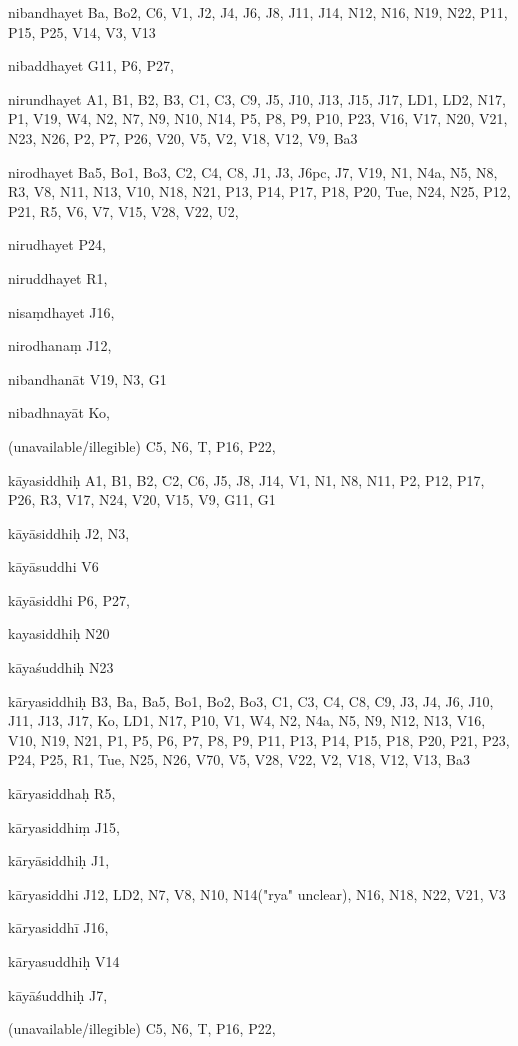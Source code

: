 \begin{ekdosis}
\begin{marma}[hp01_055]
 \begin{marma}[hp02_003]
\item[nibandhayet] Ba, Bo2, C6, V1, J2, J4, J6, J8, J11, J14, N12, N16, N19, N22, P11, P15, P25, V14, V3, V13
\item[nibaddhayet] G11, P6, P27,
\item[nirundhayet] A1, B1, B2, B3, C1, C3, C9, J5, J10, J13, J15, J17, LD1, LD2, N17, P1, V19, W4, N2, N7, N9, N10, N14, P5, P8, P9, P10, P23, V16, V17, N20, V21, N23, N26, P2, P7, P26, V20, V5, V2, V18, V12, V9, Ba3
\item[nirodhayet] Ba5, Bo1, Bo3, C2, C4, C8, J1, J3, J6pc, J7, V19, N1, N4a, N5, N8, R3, V8, N11, N13, V10, N18, N21, P13, P14, P17, P18, P20, Tue, N24, N25, P12, P21, R5, V6, V7, V15, V28, V22, U2,
\item[nirudhayet] P24,
\item[niruddhayet] R1, 
\item[nisaṃdhayet] J16,
\item[nirodhanaṃ] J12,
\item[nibandhanāt] V19, N3, G1
\item[nibadhnayāt] Ko,
\item[(unavailable/illegible)] C5, N6, T, P16, P22,
  \begin{description}

    \end{description}
 \end{marma}



 \begin{marma}[hp02_004]
\item[kāyasiddhiḥ] A1, B1, B2, C2, C6, J5, J8, J14, V1, N1, N8, N11, P2, P12, P17, P26, R3, V17, N24, V20, V15, V9, G11, G1
\item[kāyāsiddhiḥ] J2, N3,
\item[kāyāsuddhi] V6
\item[kāyāsiddhi] P6, P27, 
\item[kayasiddhiḥ] N20
\item[kāyaśuddhiḥ] N23
\item[kāryasiddhiḥ] B3, Ba, Ba5, Bo1, Bo2, Bo3, C1, C3, C4, C8, C9, J3, J4, J6, J10, J11, J13, J17, Ko, LD1, N17, P10, V1, W4, N2, N4a, N5, N9, N12, N13, V16, V10, N19, N21, P1, P5, P6, P7, P8, P9, P11, P13, P14, P15, P18, P20, P21, P23, P24, P25, R1, Tue, N25, N26, V70, V5, V28, V22, V2, V18, V12, V13, Ba3
\item[kāryasiddhaḥ] R5,
\item[kāryasiddhiṃ] J15, 
\item[kāryāsiddhiḥ] J1,
\item[kāryasiddhi] J12, LD2, N7, V8, N10, N14("rya" unclear), N16, N18, N22, V21, V3 
\item[kāryasiddhī] J16,
\item[kāryasuddhiḥ] V14
\item[kāyāśuddhiḥ] J7,
\item[(unavailable/illegible)] C5, N6, T, P16, P22,


\end{marma}
\end{marma}
\end{ekdosis}
